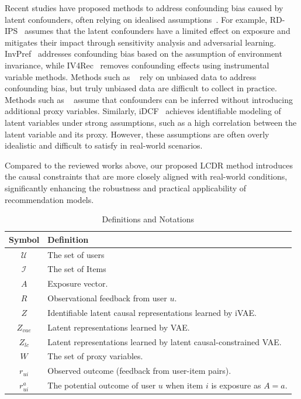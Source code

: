 \documentclass[sigconf]{acmart}
\begin{document}
Recent studies have proposed methods to address confounding bias caused by latent confounders, often relying on idealised assumptions~\cite{4,30,33,37,chen2019ildmsf,lan2023multiview,29,idcf}.  For example, RD-IPS~\cite{4} assumes that the latent confounders have a limited effect on exposure and mitigates their impact through sensitivity analysis and adversarial learning. InvPref~\cite{30} addresses confounding bias based on the assumption of environment invariance, while IV4Rec~\cite{IV-serach-data} removes confounding effects using instrumental variable methods.
Methods such as ~\cite{li2023balancing} rely on unbiased data to address  confounding bias, but truly unbiased data are difficult to collect in practice.
Methods such as ~\cite{29,38} assume that confounders can be inferred without introducing additional proxy variables. Similarly, iDCF~\cite{idcf} achieves identifiable modeling of latent variables under strong assumptions, such as a high correlation between the latent variable and its proxy. However, these assumptions are often overly idealistic and difficult to satisfy in real-world scenarios.

Compared to the reviewed works above, our proposed LCDR method introduces the causal constraints that are more closely aligned with real-world conditions, significantly enhancing the robustness and practical applicability of recommendation models.


\begin{table}[t]
  \centering
  \caption{Definitions and Notations}
  \label{tab:notation}
  \begin{tabular}{c p{5cm}}
    \toprule
    \textbf{Symbol} & \textbf{Definition} \\
    \midrule
    $\mathcal{U}$ & The set of users \\
    $\mathcal{I}$ & The set of Items \\
    ${A}$ & Exposure vector. \\
    ${R}$ & Observational feedback from user $u$. \\
    ${Z}$ & Identifiable latent causal representations learned by iVAE.  \\
    ${Z_{vae}}$ & Latent representations learned by VAE. \\
    ${Z_{lc}}$ & Latent representations learned by latent causal-constrained VAE. \\
    ${W}$ & The set of proxy variables. \\
    $r_{ui}$ & Observed outcome (feedback from user-item pairs). \\
    $r_{ui}^a$ & The potential outcome of user $u$ when item $i$ is exposure as $A=a$. \\
    \bottomrule
  \end{tabular}
\end{table}
\end{document}
